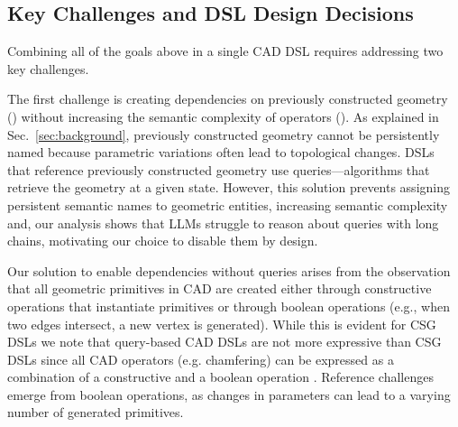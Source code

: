 \subsection{Key Challenges and DSL Design Decisions}

Combining all of the goals above in a single CAD DSL requires addressing two key challenges.


The first challenge is creating dependencies on previously constructed geometry (\dgone{}) without increasing the semantic complexity of operators (\dgthree{}). 
As explained in Sec.~\ref{sec:background}, previously constructed geometry cannot be persistently named because parametric variations often lead to topological changes. DSLs that reference previously constructed geometry use queries—algorithms that retrieve the geometry at a given state. However, this solution prevents assigning persistent semantic names to geometric entities, increasing semantic complexity and, our analysis shows that LLMs struggle to reason about queries with long chains, motivating our choice to disable them by design.



Our solution to enable dependencies without queries arises from the observation that all geometric primitives in CAD are created either through constructive operations that instantiate primitives or through boolean operations (e.g., when two edges intersect, a new vertex is generated). While this is evident for CSG DSLs we note that query-based CAD DSLs are not more expressive than CSG DSLs since all CAD operators (e.g. chamfering) can be expressed as a combination of a constructive and a boolean operation \cite{cascaval2023lineage}.
Reference challenges emerge from boolean operations, as changes in parameters can lead to a varying number of generated primitives.

